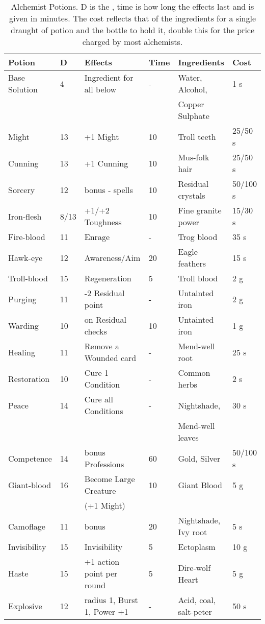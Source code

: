 \documentclass[a4paper,11pt,oneside]{book}
\newcommand{\textlf}[1]{\textbf{\titlecap{#1}}}
\begin{document}
\begin{table}[ht!]
\caption{Alchemist Potions. D is the \textlf{difficulty}, time is how long the effects last and is given in minutes. The cost reflects that of the ingredients for a single draught of potion and the bottle to hold it, double this for the price charged by most alchemists.}
\begin{tabular}{|l|l|l|l|l|l|}
\hline
Potion & D & Effects & Time & Ingredients & Cost \\
\hline
Base Solution & 4 & Ingredient for all below & - & Water, Alcohol,  & 1 s \\
 & & & & Copper Sulphate & \\
\hline
Might &  13 & +1 Might & 10 & Troll teeth & 25/50 s \\
Cunning & 13 & +1 Cunning & 10 & Mus-folk hair & 25/50 s \\
Sorcery & 12 &\textlf{edge} bonus - spells & 10 & Residual crystals & 50/100 s\\
Iron-flesh & 8/13 & +1/+2 Toughness & 10 & Fine granite power & 15/30 s \\
Fire-blood & 11 & Enrage & - & Trog blood & 35 s \\
Hawk-eye & 12 & \textlf{edge} Awareness/Aim & 20 & Eagle feathers & 15 s \\
Troll-blood & 15 & Regeneration & 5 & Troll blood & 2 g \\
Purging & 11 & -2 Residual point & - & Untainted iron & 2 g\\
Warding & 10 & \textlf{edge} on Residual checks & 10 & Untainted iron & 1 g \\ 
Healing & 11 & Remove a Wounded card & - & Mend-well root & 25 s \\
Restoration & 10 & Cure 1 Condition & - & Common herbs & 2 s \\
Peace & 14 & Cure all Conditions & - & Nightshade,  & 30 s \\
 & & & & Mend-well leaves & \\
Competence & 14 & \textlf{edge} bonus Professions & 60 & Gold, Silver & 50/100 s \\
Giant-blood & 16 & Become Large Creature  & 10 & Giant Blood & 5 g \\
 & & (+1 Might) & & & \\
Camoflage & 11 & \textlf{Stealth edge} bonus & 20 & Nightshade, Ivy root & 5 s \\
Invisibility & 15 & Invisibility & 5 & Ectoplasm & 10 g \\
Haste & 15 & +1 action point per round & 5 & Dire-wolf Heart & 5 g \\ 
Explosive & 12 & radius 1, Burst 1, Power +1 & - & Acid, coal, salt-peter & 50 s \\
\hline
\end{tabular}
\label{tab:alch}
\end{table}
\end{document}
